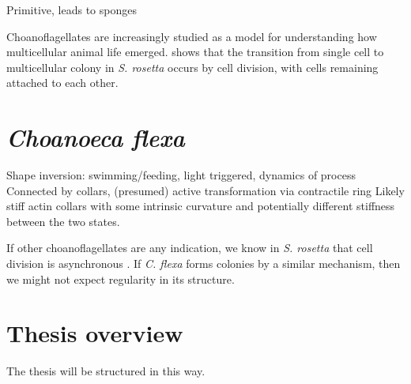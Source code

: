 Primitive, leads to sponges

Choanoflagellates are increasingly studied as a model for understanding how multicellular animal life emerged. \citet{fairclough2010} shows that the transition from single cell to multicellular colony in \textit{S. rosetta} occurs by cell division, with cells remaining attached to each other. 

\section{\textit{Choanoeca flexa}}  %

Shape inversion: swimming/feeding, light triggered, dynamics of process
Connected by collars, (presumed) active transformation via contractile ring
Likely stiff actin collars with some intrinsic curvature and potentially different stiffness between the two states.

If other choanoflagellates are any indication, we know in \textit{S. rosetta} that cell division is asynchronous \citep{fairclough2010}. If \textit{C. flexa} forms colonies by a similar mechanism, then we might not expect regularity in its structure. 

\section{Thesis overview}

The thesis will be structured in this way.
